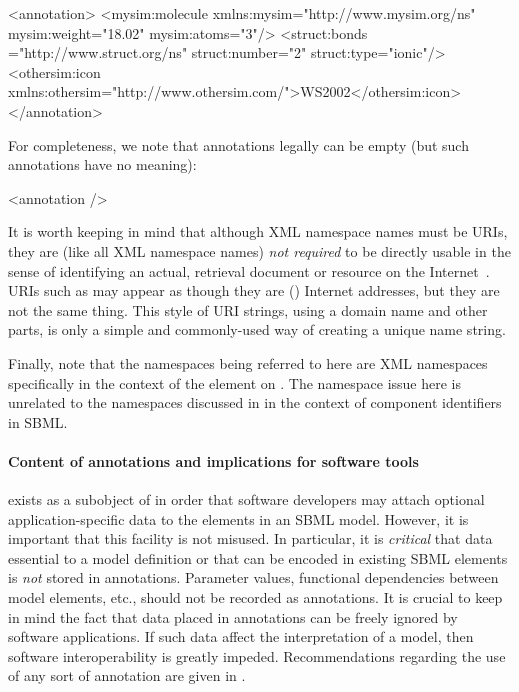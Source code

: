 \begin{example}
<annotation>
   <mysim:molecule xmlns:mysim="http://www.mysim.org/ns" mysim:weight="18.02" mysim:atoms="3"/>
   <struct:bonds ="http://www.struct.org/ns" struct:number="2" struct:type="ionic"/>
   <othersim:icon xmlns:othersim="http://www.othersim.com/">WS2002</othersim:icon>
</annotation>
\end{example}

For completeness, we note that annotations legally can be
empty (but such annotations have no meaning):

\begin{example}
<annotation />
\end{example}

It is worth keeping in mind that although XML namespace names must
be URIs, they are (like all XML namespace names) \emph{not
  required} to be directly usable in the sense of identifying an
actual, retrieval document or resource on the
Internet~\citep{bray:1999}.  URIs such as
 may appear as though they are (\eg)
Internet addresses, but they are not the same thing.  This style
of URI strings, using a domain name and other parts, is only a
simple and commonly-used way of creating a unique name string.

Finally, note that the namespaces being referred to here are XML
namespaces specifically in the context of the 
element on \SBase.  The namespace issue here is unrelated to the
namespaces discussed in  in the
context of component identifiers in SBML.


\paragraph{Content of annotations and implications for software tools}

\Annotation exists as a subobject of \SBase in
order that software developers may attach optional
application-specific data to the elements in an SBML model.
However, it is important that this facility is not misused.  In
particular, it is \emph{critical} that data essential to a model
definition or that can be encoded in existing SBML elements is
\emph{not} stored in annotations.  Parameter values,
functional dependencies between model elements, etc., should not
be recorded as annotations.  It is crucial to keep in mind the
fact that data placed in annotations can be freely ignored by
software applications.  If such data affect the interpretation of
a model, then software interoperability is greatly impeded.  
Recommendations regarding the use of any sort of annotation are
given in .  


